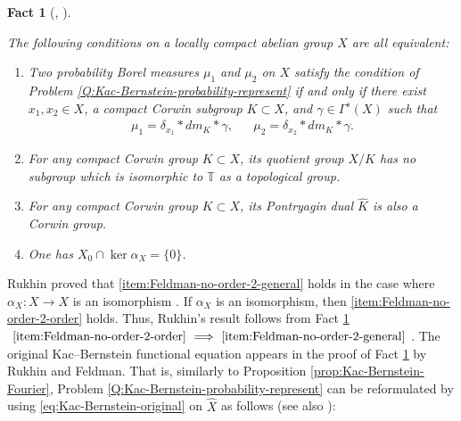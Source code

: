 \documentclass[12pt]{article}
\newtheorem{fact}[theorem]{Fact}
\theoremstyle{definition}
\theoremstyle{remark}
\numberwithin{equation}{section}
\numberwithin{figure}{section}
\numberwithin{table}{section}
\begin{document}
\begin{fact}[{\cite[Theorem 4]{feld1987bernstein}, \cite[Theorems 9.19 and 9.21 and Proposition 9.20]{MR1206473}}]
    \label{fact:Feldman-no-order-2}

The following conditions on a locally compact abelian group $ X $ are all equivalent:

\begin{enumerate}
    \item \label{item:Feldman-no-order-2-general}

Two probability Borel measures $ \mu_1 $ and $ \mu_2 $ on $ X $ satisfy the condition of Problem \ref{Q:Kac-Bernstein-probability-represent} if and only if there exist $ x_1 , x_2 \in X $, a compact Corwin subgroup $ K \subset X $, and $ \gamma \in \Gamma^s ( X ) $ such that
    \begin{align}
        \mu_1 = \delta_{ x_1 } * dm_K * \gamma, & &
        \mu_2 = \delta_{ x_2 } * dm_K * \gamma.
    \end{align}

\item \label{item:Feldman-no-order-2-T}

For any compact Corwin group $ K \subset X $, its quotient group $ X / K $ has no subgroup which is isomorphic to $ \mathbb{ T } $ as a topological group.

\item \label{item:Feldman-no-order-2-Corwin}

For any compact Corwin group $ K \subset X $, its Pontryagin dual $ \hat{ K } $ is also a Corwin group.

\item \label{item:Feldman-no-order-2-order}

One has $ X_0 \cap \ker \alpha_X = \{ 0 \} $.

\end{enumerate}
    
\end{fact}

Rukhin proved that \ref{item:Feldman-no-order-2-general} holds in the case where $ \alpha_X \colon X \to X $ is an isomorphism \cite{rukhin1969theorem}.
If $ \alpha_X $ is an isomorphism, then \ref{item:Feldman-no-order-2-order} holds.
Thus, Rukhin's result follows from Fact \ref{fact:Feldman-no-order-2} $ \text{ \ref{item:Feldman-no-order-2-order} } \Longrightarrow \text{ \ref{item:Feldman-no-order-2-general} } $.
The original Kac--Bernstein functional equation appears in the proof of Fact \ref{fact:Feldman-no-order-2} by Rukhin and Feldman.
That is, similarly to Proposition \ref{prop:Kac-Bernstein-Fourier}, Problem \ref{Q:Kac-Bernstein-probability-represent} can be reformulated by using \eqref{eq:Kac-Bernstein-original} on $ \hat{ X } $ as follows (see also \cite[Lemma 4.2]{MR4566375}):
\end{document}
